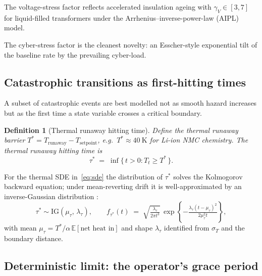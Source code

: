 \documentclass[11pt,a4paper]{article}
\theoremstyle{ia}
\newtheorem{definition}[theorem]{Definition}
\newcommand{\E}{\mathbb{E}}
\newcommand{\1}{\mathbf{1}}
\begin{document}
The voltage-stress factor reflects accelerated insulation ageing
with $\gamma_V\in[3,7]$ for liquid-filled transformers under the
Arrhenius--inverse-power-law (AIPL) model.

The cyber-stress factor is the cleanest novelty: an Esscher-style
exponential tilt of the baseline rate by the prevailing cyber-load.

\subsection{Catastrophic transitions as first-hitting times}

A subset of catastrophic events are best modelled not as smooth
hazard increases but as the first time a state variable crosses a
critical boundary.

\begin{definition}[Thermal runaway hitting time]\label{def:hit}
Define the thermal runaway barrier
$T^* = T_{\mathrm{runaway}}-T_{\mathrm{setpoint}}$, e.g.\
$T^*\approx \SI{40}{\kelvin}$ for Li-ion NMC chemistry. The thermal
runaway hitting time is
\begin{equation}\label{eq:hitting}
   \tau^* \;=\; \inf\{\,t>0 : T_t \geq T^*\,\}.
\end{equation}
\end{definition}

For the thermal SDE in~\eqref{eq:sde} the distribution of $\tau^*$
solves the Kolmogorov backward equation; under mean-reverting drift it
is well-approximated by an inverse-Gaussian distribution
\citep{Chhikara1989}:
\begin{equation}\label{eq:IG}
   \tau^* \sim \mathrm{IG}(\mu_{\tau},\,\lambda_{\tau}),\qquad
   f_{\tau^*}(t) \;=\;
   \sqrt{\tfrac{\lambda_{\tau}}{2\pi t^{3}}}\,
   \exp\!\left\{-\tfrac{\lambda_{\tau}(t-\mu_{\tau})^2}{2\mu_{\tau}^2 t}\right\},
\end{equation}
with mean $\mu_\tau=T^*/\alpha\,\E[\text{net heat in}]$ and shape
$\lambda_\tau$ identified from $\sigma_T$ and the boundary distance.

\subsection{Deterministic limit: the operator's grace period}
\label{ss:tcrit}
\end{document}
